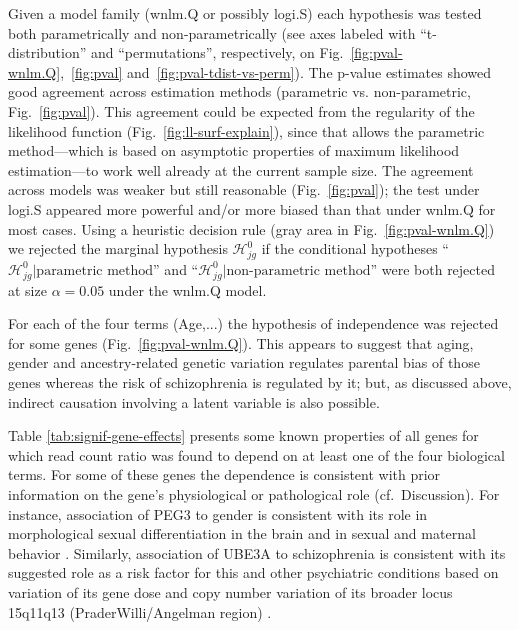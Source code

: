\documentclass[letterpaper]{article}
\begin{document}
Given a model family (wnlm.Q or possibly logi.S) each hypothesis was tested both parametrically
and non-parametrically (see axes labeled with ``t-distribution'' and
``permutations'', respectively,
on Fig.~\ref{fig:pval-wnlm.Q},~\ref{fig:pval} and~\ref{fig:pval-tdist-vs-perm}). The p-value estimates showed good agreement across estimation methods
(parametric vs. non-parametric, Fig.~\ref{fig:pval}). This agreement could be expected from the regularity
of the likelihood function (Fig.~\ref{fig:ll-surf-explain}), since that allows
the parametric method---which is based
on asymptotic properties of maximum likelihood estimation---to work well already at the current
sample size. The agreement across models was weaker but still reasonable (Fig.~\ref{fig:pval}); the test
under logi.S appeared more powerful and/or more biased than that under wnlm.Q for most cases. Using a
heuristic decision rule (gray area in Fig.~\ref{fig:pval-wnlm.Q}) we rejected
the marginal hypothesis \(\mathcal{H}^0_{jg}\) if the conditional
hypotheses ``\(\mathcal{H}^0_{jg} |\text{parametric method}\)'' and
``\(\mathcal{H}^0_{jg} |\text{non-parametric method}\)'' were both rejected at size
\(\alpha = 0.05\) under the wnlm.Q model.

For each of the four terms (Age,...) the hypothesis of independence was rejected for some genes
(Fig.~\ref{fig:pval-wnlm.Q}). This appears to suggest that aging, gender and ancestry-related genetic variation regulates
parental bias of those genes whereas the risk of schizophrenia is regulated by it; but, as discussed
above, indirect causation involving a latent variable is also possible.

\begin{table}
\footnotesize

\caption{}
\label{tab:signif-gene-effects}
\end{table}

Table \ref{tab:signif-gene-effects} presents some known properties of all genes for which read count ratio was found
to depend on at least one of the four biological terms. For some of these genes the dependence
is consistent with prior information on the gene's physiological or pathological role (cf.~Discussion).
For instance, association of PEG3 to gender is consistent with its role in morphological sexual
differentiation in the brain and in sexual and maternal behavior \cite{Broad2009}. Similarly, association of
UBE3A to schizophrenia is consistent with its suggested role as a risk factor for this and other
psychiatric conditions based on variation of its gene dose and copy number variation of its broader
locus 15q11q13 (PraderWilli/Angelman region) \cite{Sullivan2012, McNamara2013}.
\end{document}
